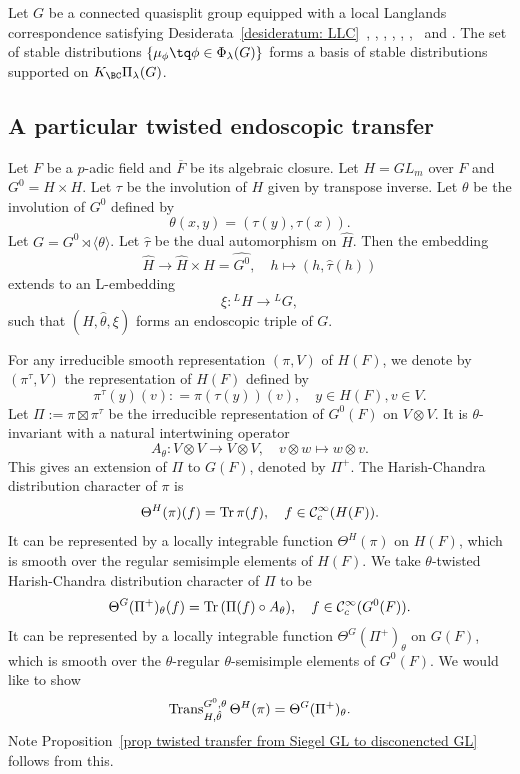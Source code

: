\documentclass[11pt,letterpaper]{amsart}
\numberwithin{equation}{section}
\begin{document}
\begin{theorem}\label{thm: stable standards form a basis - quasisplit}
Let $G$ be a connected quasisplit group equipped with a local Langlands correspondence satisfying Desiderata~\ref{desideratum: LLC}\ \TW, \Sta, \LC, \CTD, \CCh, \ECR, \TI\ and \Hai.
The set of stable distributions $\{\mu_{\phi} \tq \phi \in \Phi_{\lambda}(G)\}$ forms a basis of stable distributions supported on $K_{\BC}\Pi_{\lambda}(G)$.
\end{theorem}



\subsection{A particular twisted endoscopic transfer}
\label{subsection: twisted transfer Bin}

Let $F$ be a $p$-adic field and $\overline{F}$ be its algebraic closure. Let $H = GL_m$ over $F$ and $G^0 = H \times H$. Let $\tau$ be the involution of $H$ given by transpose inverse. Let $\theta$ be the involution of $G^0$ defined by
\[
\theta(x, y) = (\tau(y), \tau(x)).
\]
Let $G = G^0 \rtimes \langle \theta \rangle$. Let $\hat{\tau}$ be the dual automorphism on $\widehat{H}$. Then the embedding
\[
\widehat{H} \rightarrow \widehat{H} \times \widehat{H} = \widehat{G^0}, \quad h \mapsto (h, \hat{\tau}(h))
\]
extends to an L-embedding 
\[
\xi: {}^LH \rightarrow {}^LG,
\]
such that $(H, \hat{\theta}, \xi)$ forms an endoscopic triple of $G$. 

For any irreducible smooth representation $(\pi, V)$ of $H(F)$, we denote by $(\pi^{\tau}, V)$ the representation of $H(F)$ defined by 
\[
\pi^{\tau}(y)(v) : = \pi(\tau(y))(v), \quad y \in H(F), v \in V.
\] 
Let $\Pi := \pi \boxtimes \pi^{\tau}$ be the irreducible representation of $G^0(F)$ on $V \otimes V$. It is $\theta$-invariant with a natural intertwining operator
\[
A_{\theta}: V \otimes V \rightarrow V \otimes V, \quad v \otimes w \mapsto w \otimes v.
\]
This gives an extension of $\Pi$ to $G(F)$, denoted by $\Pi^{+}$. The Harish-Chandra distribution character of $\pi$ is 
\[
\Theta^{H}(\pi)(f) = {\rm Tr} \, \pi(f), \quad f \in \mathcal{C}^{\infty}_{c}(H(F)).
\]
It can be represented by a locally integrable function $\Theta^{H}(\pi)$ on $H(F)$, which is smooth over the regular semisimple elements of $H(F)$. We take $\theta$-twisted Harish-Chandra distribution character of $\Pi$ to be
\[
\Theta^{G}(\Pi^{+})_{\theta}(f) = {\rm Tr} \, (\Pi(f) \circ A_{\theta}), \quad f \in \mathcal{C}^{\infty}_{c}(G^0(F)).
\]
It can be represented by a locally integrable function $\Theta^{G}(\Pi^{+})_{\theta}$ on $G(F)$, which  is smooth over the $\theta$-regular $\theta$-semisimple elements of $G^0(F)$. 
We would like to show 
\begin{align}
\label{eq: twisted endoscopic transfer GL}
{\rm Trans}_{H, \hat{\theta}}^{G^0, \theta} \, \Theta^{H}(\pi) = \Theta^{G}(\Pi^{+})_{\theta}.
\end{align}
Note Proposition~\ref{prop twisted transfer from Siegel GL to disconencted GL} follows from this.
\end{document}
